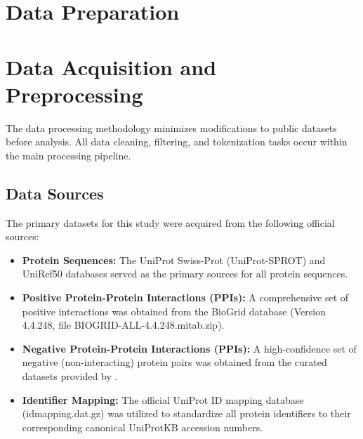 \documentclass[utf8]{frontiers_suppmat}
\begin{document}
	\section{Data Preparation}
\section{Data Acquisition and Preprocessing}
The data processing methodology minimizes modifications to public datasets before analysis. All data cleaning, filtering, and tokenization tasks occur within the main processing pipeline.
\subsection{Data Sources}
The primary datasets for this study were acquired from the following official sources:
\begin{itemize}
	\item \textbf{Protein Sequences:} The UniProt Swiss-Prot (UniProt-SPROT) and UniRef50 databases served as the primary sources for all protein sequences.
	\item \textbf{Positive Protein-Protein Interactions (PPIs):} A comprehensive set of positive interactions was obtained from the BioGrid database (Version 4.4.248, file BIOGRID-ALL-4.4.248.mitab.zip).
	\item \textbf{Negative Protein-Protein Interactions (PPIs):} A high-confidence set of negative (non-interacting) protein pairs was obtained from the curated datasets provided by \cite{trabuco_negativeproteinprotein_2012}.
	\item \textbf{Identifier Mapping:} The official UniProt ID mapping database (idmapping.dat.gz) was utilized to standardize all protein identifiers to their corresponding canonical UniProtKB accession numbers.
\end{itemize}
\end{document}
